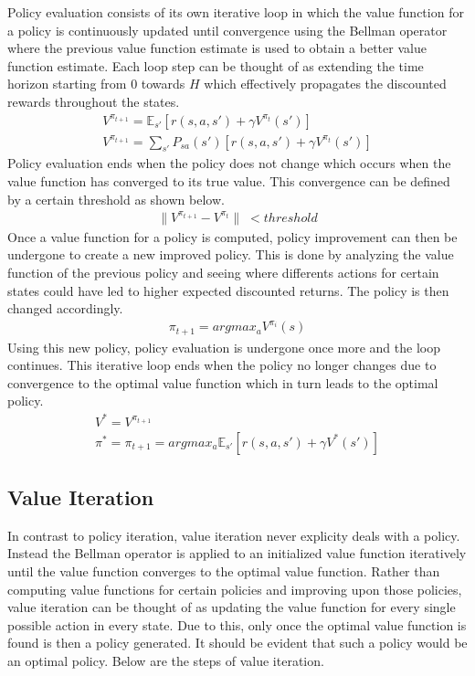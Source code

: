 \documentclass[fullpage]{article}
\begin{document}
Policy evaluation consists of its own iterative loop in which the value function for a policy is continuously updated until convergence using the Bellman operator where the previous value function estimate is used to obtain a better value function estimate. Each loop step can be thought of as extending the time horizon starting from 0 towards $H$ which effectively propagates the discounted rewards throughout the states.
\begin{gather}
V^{\pi_{t+1}} = \mathbb{E}_{s'}[r(s, a, s') + \gamma V^{\pi_t}(s')] \\
V^{\pi_{t+1}} = \sum_{s'} P_{sa}(s') [r(s, a, s') + \gamma V^{\pi_t}(s')]
\end{gather}
Policy evaluation ends when the policy does not change which occurs when the value function has converged to its true value. This convergence can be defined by a certain threshold as shown below.
\begin{gather}
\lVert V^{\pi_{t+1}} - V^{\pi_{t}} \lVert \; < threshold 
\end{gather}
Once a value function for a policy is computed, policy improvement can then be undergone to create a new improved policy. This is done by analyzing the value function of the previous policy and seeing where differents actions for certain states could have led to higher expected discounted returns. The policy is then changed accordingly.
\begin{gather}
\pi_{t+1} = argmax_a V^{\pi_i}(s)
\end{gather}
Using this new policy, policy evaluation is undergone once more and the loop continues. This iterative loop ends when the policy no longer changes due to convergence to the optimal value function which in turn leads to the optimal policy.
\begin{gather}
V^* = V^{\pi_{t+1}} \\
\pi^* = \pi_{t+1} = argmax_a \mathbb{E}_{s'}[r(s, a, s') + \gamma V^*(s')]
\end{gather}

\subsection{Value Iteration}
In contrast to policy iteration, value iteration never explicity deals with a policy. Instead the Bellman operator is applied to an initialized value function iteratively until the value function converges to the optimal value function. Rather than computing value functions for certain policies and improving upon those policies, value iteration can be thought of as updating the value function for every single possible action in every state. Due to this, only once the optimal value function is found is then a policy generated. It should be evident that such a policy would be an optimal policy. Below are the steps of value iteration. 
\end{document}
